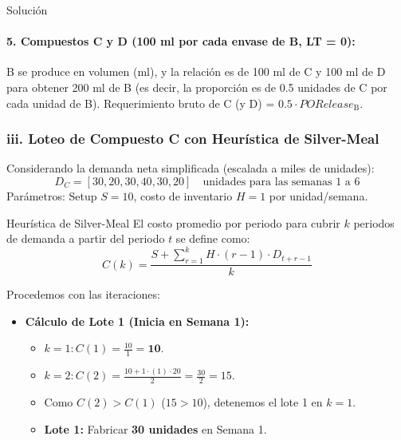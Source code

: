 \documentclass[11pt, a4paper]{article}
\begin{document}
\begin{ejercicio}{Solución}
  \paragraph{5. Compuestos C y D (100 ml por cada envase de B, LT = 0):}
  B se produce en volumen (ml), y la relación es de 100 ml de C y 100 ml de D para obtener 200 ml de B (es decir, la proporción es de 0.5 unidades de C por cada unidad de B).
  Requerimiento bruto de C (y D) = $0.5 \cdot PORelease_{\text{B}}$.
  \begin{center}
  \small
  \end{center}

  \subsubsection*{iii. Loteo de Compuesto C con Heurística de Silver-Meal}
  Considerando la demanda neta simplificada (escalada a miles de unidades):
  \begin{equation*}
    D_C = [30, 20, 30, 40, 30, 20] \quad \text{unidades para las semanas 1 a 6}
  \end{equation*}
  Parámetros: Setup $S = 10$, costo de inventario $H = 1$ por unidad/semana.

  \begin{formulas}{Heurística de Silver-Meal}
    El costo promedio por periodo para cubrir $k$ periodos de demanda a partir del periodo $t$ se define como:
    \begin{equation*}
      C(k) = \frac{S + \sum_{r=1}^{k} H \cdot (r - 1) \cdot D_{t + r - 1}}{k}
    \end{equation*}
  \end{formulas}

  Procedemos con las iteraciones:
  \begin{itemize}
    \item \textbf{Cálculo de Lote 1 (Inicia en Semana 1):}
    \begin{itemize}
      \item $k=1: C(1) = \frac{10}{1} = \mathbf{10}$.
      \item $k=2: C(2) = \frac{10 + 1 \cdot (1) \cdot 20}{2} = \frac{30}{2} = 15$.
      \item Como $C(2) > C(1)$ ($15 > 10$), detenemos el lote 1 en $k=1$.
      \item \textbf{Lote 1:} Fabricar \textbf{30 unidades} en Semana 1.
    \end{itemize}


\end{itemize}
\end{ejercicio}
\end{document}
